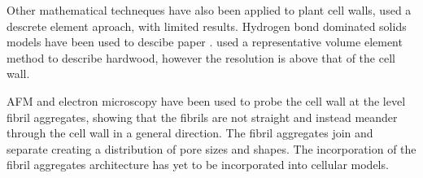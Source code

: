 Other mathematical techneques have also been applied to plant cell walls, \cite{HEPWORTH_1998} used a descrete element aproach, with limited results. Hydrogen bond dominated solids models have been used to descibe paper \cite{nissan1997link}\cite{batten1987unified}\cite{nissan1987unified}\cite{batten1987unified}. \cite{Zhan_2014} used a representative volume element method to describe hardwood, however the resolution is above that of the cell wall.

AFM and electron microscopy have been used to probe the cell wall at the level fibril aggregates, showing that the fibrils are not straight and instead meander through the cell wall in a general direction. The fibril aggregates join and separate creating a distribution of pore sizes and shapes. The incorporation of the fibril aggregates architecture has yet to be incorporated into cellular models. 